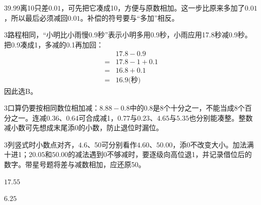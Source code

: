 \documentclass[multi=snippet,border={5bp 20bp 5bp 5bp}]{standalone}
\newenvironment{snippet}[3]{\begin{minipage}{#1bp}\color{answerred}\fontsize{#2}{#3}\selectfont\raggedright}{\end{minipage}}
\begin{document}
\begin{snippet}{505}{11.5}{14}\begin{multicols}{3}\raggedcolumns \(9.99\)\allowbreak 离10只差\(0.01\)\allowbreak ，可先把它凑成10，方便与原数相加。这一步比原来多加了\(0.01\)\allowbreak ，所以最后必须减回\(0.01\)\allowbreak 。补偿的符号要与“多加”相反。\end{multicols}\end{snippet}
\begin{snippet}{505}{11.5}{14}\begin{multicols}{3}\raggedcolumns 路程相同，“小明比小雨慢0.9秒”表示小明多用0.9秒，小雨应用17.8秒减0.9秒。把0.9凑成1，多减的0.1再加回：\[\begin{aligned}&17.8-0.9\\={}&17.8-1+0.1\\={}&16.8+0.1\\={}&16.9\text{(秒)}\end{aligned}\]因此选B。\end{multicols}\end{snippet}
\begin{snippet}{505}{11.5}{14}\begin{multicols}{3}\raggedcolumns 口算仍要按相同数位相加减：\(8.88-0.8\)\allowbreak 中的\(0.8\)\allowbreak 是8个十分之一，不能当成8个百分之一。连减\(0.36\)\allowbreak 、\(0.64\)\allowbreak 可合成减1，\(0.77\)\allowbreak 与\(0.23\)\allowbreak 、\(4.65\)\allowbreak 与\(5.35\)\allowbreak 也分别能凑整。整数减小数可先想成末尾添0的小数，防止退位时漏位。\end{multicols}\end{snippet}
\begin{snippet}{505}{11.5}{14}\begin{multicols}{3}\raggedcolumns 列竖式时小数点对齐，\(4.6\)\allowbreak 、50可分别看作\(4.60\)\allowbreak 、\(50.00\)\allowbreak ，添0不改变大小。加法满十进1；\(20.05\)\allowbreak 和\(50.00\)\allowbreak 的减法遇到0不够减时，要逐级向高位退1，并记录借位后的数字。带星号题将差与减数相加，应还原50。\end{multicols}\end{snippet}
\begin{snippet}{37.0}{10.5}{14}\SourceSans\setlength{\mathindent}{2bp}\(17.55\)\end{snippet}
\begin{snippet}{37.0}{10.5}{14}\SourceSans\setlength{\mathindent}{2bp}\(6.25\)\end{snippet}
\end{document}

